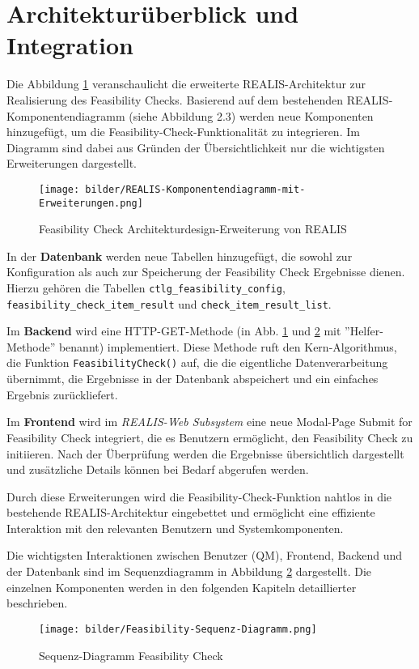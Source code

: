 \section{Architekturüberblick und Integration}

Die Abbildung \ref{fig:feasibility-check-komponentendiagramm} veranschaulicht die erweiterte REALIS-Architektur zur Realisierung des Feasibility Checks. Basierend auf dem bestehenden REALIS-Komponenten\-diagramm (siehe Abbildung 2.3) werden neue Komponenten hinzugefügt, um die Feasibility-Check-Funktionalität zu integrieren. Im Diagramm sind dabei aus Gründen der Übersichtlichkeit nur die wichtigsten Erweiterungen dargestellt.

\begin{figure}[!htbp]
    \centering
    \texttt{[image: bilder/REALIS-Komponentendiagramm-mit-Erweiterungen.png]}
    \caption{Feasibility Check Architekturdesign-Erweiterung von \gls{REALIS}}
    \label{fig:feasibility-check-komponentendiagramm}
\end{figure}



In der \textbf{Datenbank} werden neue Tabellen hinzugefügt, die sowohl zur Konfiguration als auch zur Speicherung der Feasibility Check Ergebnisse dienen. Hierzu gehören die Tabellen \texttt{ctlg\_feasibility\_config}, \texttt{feasibility\_check\_item\_result} und \texttt{check\_item\_\-result\_\-list}.

Im \textbf{Backend} wird eine HTTP-GET-Methode (in Abb. \ref{fig:feasibility-check-komponentendiagramm} und \ref{fig:sequence-diagram} mit ''Helfer-Methode'' benannt) implementiert. Diese Methode ruft den Kern-Algorithmus, die Funktion \texttt{FeasibilityCheck()} auf, die die eigentliche Datenverarbeitung übernimmt, die Ergebnisse in der Datenbank abspeichert und ein einfaches Ergebnis zurückliefert.

Im \textbf{Frontend} wird im \textit{REALIS-Web Subsystem} eine neue Modal-Page \glqq Submit for Feasibility Check\grqq{} integriert, die es Benutzern ermöglicht, den Feasibility Check zu initiieren. Nach der Überprüfung werden die Ergebnisse übersichtlich dargestellt und zusätzliche Details können bei Bedarf abgerufen werden. 

Durch diese Erweiterungen wird die Feasibility-Check-Funktion nahtlos in die bestehende REALIS-Architektur eingebettet und ermöglicht eine effiziente Interaktion mit den relevanten Benutzern und Systemkomponenten.

Die wichtigsten Interaktionen zwischen Benutzer (\gls{QM}), Frontend, Backend und der Datenbank sind im Sequenzdiagramm in Abbildung \ref{fig:sequence-diagram} dargestellt. Die einzelnen Komponenten werden in den folgenden Kapiteln detaillierter beschrieben. 

\begin{figure}[!htbp]
    \centering
    \texttt{[image: bilder/Feasibility-Sequenz-Diagramm.png]}
    \caption{Sequenz-Diagramm Feasibility Check}
    \label{fig:sequence-diagram}
\end{figure}


